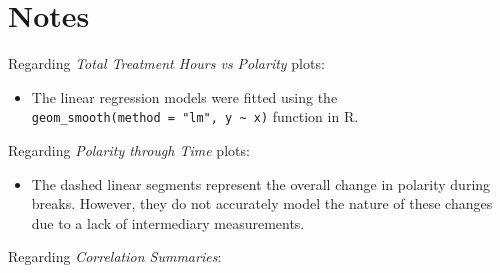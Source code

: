 \documentclass[]{article}
\providecommand{\tightlist}{%
  \setlength{\itemsep}{0pt}\setlength{\parskip}{0pt}}
\begin{document}
\section{Notes}\label{notes}

Regarding \emph{Total Treatment Hours vs Polarity} plots:

\begin{itemize}
\tightlist
\item
  The linear regression models were fitted using the
  \texttt{geom\_smooth(method\ =\ "lm",\ y\ \textasciitilde{}\ x)}
  function in R.
\end{itemize}

Regarding \emph{Polarity through Time} plots:

\begin{itemize}
\tightlist
\item
  The dashed linear segments represent the overall change in polarity
  during breaks. However, they do not accurately model the nature of
  these changes due to a lack of intermediary measurements.
\end{itemize}

Regarding \emph{Correlation Summaries}:
\end{document}
